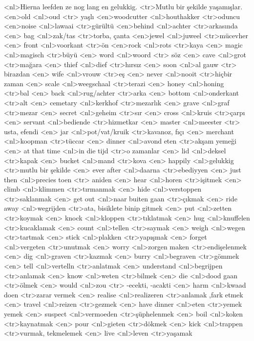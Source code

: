 <nl>Hierna leefden ze nog lang en gelukkig. 
<tr>Mutlu bir şekilde yaşamışlar.
<en>old
<nl>oud 
<tr> yaşlı
<en>woodcutter
<nl>houthakker 
<tr>oduncu
<en>noise 
<nl>lawaai
<tr>gürültü
<en>behind 
<nl>achter 
<tr>arkasında
<en> bag 
<nl>zak/tas 
<tr>torba, çanta
<en>jewel 
<nl>juweel 
<tr>mücevher
<en> front 
<nl>voorkant 
<tr>ön
<en>rock 
<nl>rots 
<tr>kaya
<en> magic 
<nl>magisch 
<tr>büyü
<en> word 
<nl>woord 
<tr> söz
<en> cave 
<nl>grot 
<tr>mağara
<en> thief 
<nl>dief 
<tr>hırsız
<en> soon 
<nl>al gauw 
<tr> birazdan
<en> wife 
<nl>vrouw 
<tr>eş
<en> never 
<nl>nooit 
<tr>hiçbir zaman
<en> scale 
<nl>weegschaal 
<tr>terazi
<en> honey 
<nl>honing 
<tr>bal
<en> back 
<nl>rug/achter 
<tr>arka
<en> bottom 
<nl>onderkant 
<tr>alt
<en> cemetary 
<nl>kerkhof 
<tr>mezarlık
<en> grave 
<nl>graf 
<tr>mezar
<en> secret 
<nl>geheim 
<tr>sır
<en> cross 
<nl>kruis 
<tr>çarpı
<en> servant 
<nl>bediende 
<tr>hizmetkar
<en> master 
<nl>meester 
<tr> usta, efendi
<en> jar 
<nl>pot/vat/kruik 
<tr>kavanoz, fıçı
<en> merchant 
<nl>koopman 
<tr>tüccar
<en> dinner 
<nl>avond eten 
<tr>akşam yemeği
<en> at that time 
<nl>in die tijd  
<tr>o zamanlar 
<en> lid 
<nl>deksel 
<tr>kapak
<en> bucket 
<nl>mand 
<tr>kova
<en> happily 
<nl>gelukkig 
<tr>mutlu bir şekilde
<en> ever after 
<nl>daarna 
<tr>ebediyyen
<en> just then 
<nl>precies toen 
<tr> aniden
<en> hear 
<nl>horen 
<tr>işitmek
<en> climb 
<nl>klimmen 
<tr>tırmanmak
<en> hide 
<nl>verstoppen 
<tr>saklanmak
<en> get out 
<nl>naar buiten gaan 
<tr>çıkmak 
<en> ride away 
<nl>wegrijden 
<tr>ata, bisiklete binip gitmek
<en> put 
<nl>zetten 
<tr>koymak
<en> knock 
<nl>kloppen 
<tr>tıklatmak
<en> hug 
<nl>knuffelen 
<tr>kucaklamak
<en> count 
<nl>tellen 
<tr>saymak
<en> weigh 
<nl>wegen 
<tr>tartmak
<en> stick 
<nl>plakken 
<tr>yapışmak
<en> forget 
<nl>vergeten 
<tr>unutmak
<en> worry 
<nl>zorgen maken 
<tr>endişelenmek
<en> dig 
<nl>graven 
<tr>kazmak
<en> burry 
<nl>begraven 
<tr>gömmek
<en> tell 
<nl>vertelln 
<tr>anlatmak
<en> understand 
<nl>begrijpen 
<tr>anlamak
<en> know 
<nl>weten 
<tr>bilmek
<en> die 
<nl>dood gaan 
<tr>ölmek
<en> would 
<nl>zou 
<tr> -ecekti, -acakti
<en> harm 
<nl>kwaad doen 
<tr>zarar vermek
<en> realise 
<nl>realizeren 
<tr>anlamak ,fark etmek
<en> travel 
<nl>reizen 
<tr>gezmek
<en> have dinner 
<nl>eten 
<tr>yemek yemek
<en> suspect 
<nl>vermoeden 
<tr>şüphelenmek
<en> boil 
<nl>koken 
<tr>kaynatmak
<en> pour 
<nl>gieten 
<tr>dökmek
<en> kick 
<nl>trappen 
<tr>vurmak, tekmelemek
<en> live 
<nl>leven 
<tr>yaşamak
